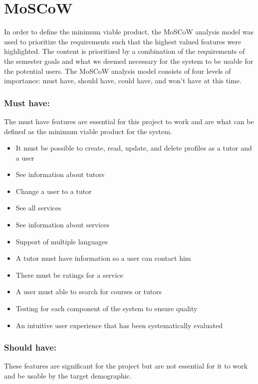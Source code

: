 \section{MoSCoW}\label{sec:moscow}
In order to define the minimum viable product, the MoSCoW analysis model was used to prioritize the requirements such that the highest valued features were highlighted.
The content is prioritized by a combination of the requirements of the semester goals and what we deemed necessary for the system to be usable for the potential users.
The MoSCoW analysis model consists of four levels of importance: must have, should have, could have, and won't have at this time.

\subsubsection{Must have:}
The must have features are essential for this project to work and are what can be defined as the minimum viable product for the system.

\begin{itemize}
    \item It must be possible to create, read, update, and delete profiles as a tutor and a user
    \item See information about tutors
    \item Change a user to a tutor
    \item See all services
    \item See information about services
    \item Support of multiple languages
    \item A tutor must have information so a user can contact him
    \item There must be ratings for a service
    \item A user must able to search for courses or tutors
    \item Testing for each component of the system to ensure quality
    \item An intuitive user experience that has been systematically evaluated
\end{itemize}

\subsubsection{Should have:}
These features are significant for the project but are not essential for it to work and be usable by the target demographic.

